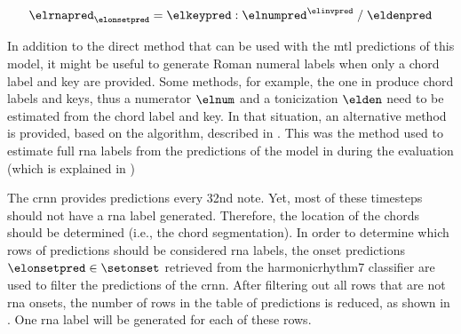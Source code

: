 \begin{equation}
    \label{eq:rna_pred}
    \elrnapred_{\elonsetpred} = \elkeypred : \elnumpred^{\elinvpred} \; / \; \eldenpred
\end{equation}



 

In addition to the direct method that can be used with the
\gls{mtl} predictions of this model, it might be useful to
generate Roman numeral labels when only a chord label and
key are provided. Some methods, for example, the one in
\textcite{mcleod2021modular} produce chord labels and keys,
thus a numerator $\elnum$ and a tonicization $\elden$ need
to be estimated from the chord label and key. In that
situation, an alternative method is provided, based on the
\algorithmrn{} algorithm, described in
.
This was the method used to estimate full \gls{rna} labels
from the predictions of the model in
\textcite{mcleod2021modular, chen2021attend} during the
evaluation (which is explained in
)



The \gls{crnn} provides predictions every \gls{32nd} note.
Yet, most of these timesteps should not have a \gls{rna}
label generated. Therefore, the location of the chords
should be determined (i.e., the chord segmentation). In
order to determine which rows of predictions should be
considered \gls{rna} labels, the onset predictions
$\elonsetpred \in \setonset$ retrieved from the
\gls{harmonicrhythm7} classifier are used to filter the
predictions of the \gls{crnn}. After filtering out all rows
that are not \gls{rna} onsets, the number of rows in the
table of predictions is reduced, as shown in
. One \gls{rna} label will
be generated for each of these rows.

